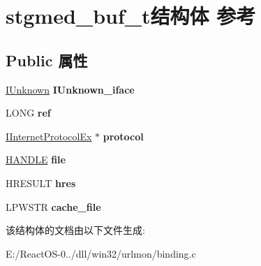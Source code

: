\hypertarget{structstgmed__buf__t}{}\section{stgmed\+\_\+buf\+\_\+t结构体 参考}
\label{structstgmed__buf__t}
\subsection*{Public 属性}
\begin{DoxyCompactItemize}
\item 
\mbox{\label{structstgmed__buf__t_abf018abe6e90533b9c297d00afa698da}} 
\hyperlink{interface_i_unknown}{I\+Unknown} {\bfseries I\+Unknown\+\_\+iface}
\item 
\mbox{\label{structstgmed__buf__t_aab2ad0933c82aea3f6eb41874b07526a}} 
L\+O\+NG {\bfseries ref}
\item 
\mbox{\label{structstgmed__buf__t_ae67c9d09f71492364db076043828154e}} 
\hyperlink{interface_i_internet_protocol_ex}{I\+Internet\+Protocol\+Ex} $\ast$ {\bfseries protocol}
\item 
\mbox{\label{structstgmed__buf__t_ae99206cdd278b4f92dab41bb9edc9012}} 
\hyperlink{interfacevoid}{H\+A\+N\+D\+LE} {\bfseries file}
\item 
\mbox{\label{structstgmed__buf__t_a8175d53d438569f07da2dea924766131}} 
H\+R\+E\+S\+U\+LT {\bfseries hres}
\item 
\mbox{\label{structstgmed__buf__t_a7251f9a67a78188e5985f5042cbf18ee}} 
L\+P\+W\+S\+TR {\bfseries cache\+\_\+file}
\end{DoxyCompactItemize}


该结构体的文档由以下文件生成\+:\begin{DoxyCompactItemize}
\item 
E\+:/\+React\+O\+S-\/0../dll/win32/urlmon/binding.\+c\end{DoxyCompactItemize}
